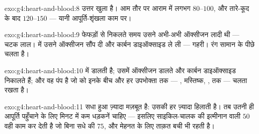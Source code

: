 \begin{solution}{exo:g4:heart-and-blood:8}
उत्तर खुला है। आम तौर पर आराम में लगभग $80$--$100$, और तारे-कूद के बाद
$120$--$150$ --- यानी आपूर्ति-शृंखला काम पर।
\end{solution}

\begin{solution}{exo:g4:heart-and-blood:9}
फेफड़ों से निकलते समय उसने अभी-अभी ऑक्सीजन लादी थी --- चटक लाल। 
में उसने ऑक्सीजन सौंप दी और कार्बन डाइऑक्साइड ले ली --- गहरी। रंग सामान
के पीछे चलता है।
\end{solution}

\begin{solution}{exo:g4:heart-and-blood:10}
  में  डालती है;  उसमें ऑक्सीजन डालते और
कार्बन डाइऑक्साइड निकालते हैं; और  वह पंप है जो  को इनके बीच
और हर उपभोक्ता तक --- , मस्तिष्क, ,  तक --- चलता
रखता है।
\end{solution}

\begin{solution}{exo:g4:heart-and-blood:11}
सधा हुआ  ज़्यादा मज़बूत  है: उसकी हर  ज़्यादा  हिलाती
है। तब उतनी ही आपूर्ति पहुँचाने के लिए मिनट में कम धड़कनें चाहिए ---
इसलिए साइकिल-चालक की इत्मीनान वाली $50$ वही काम कर देती है जो बिना सधे
की $75$, और मेहनत के लिए ताक़त बची भी रहती है।
\end{solution}

